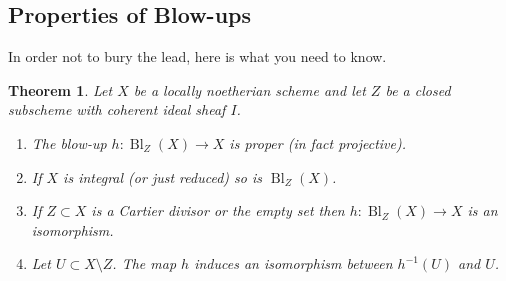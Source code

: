 \documentclass[12pt]{article}
\numberwithin{equation}{section}
\newtheorem{theorem}{Theorem}[subsection]
\theoremstyle{definition}
\newtheorem{example}[theorem]{Example}
\theoremstyle{remark}
\newcommand{\CC}{\mathbb{C}}
\newcommand{\Ocal}{\mathcal{O}}
\newcommand{\PP}{\mathbb{P}}
\renewcommand{\AA}{\mathbb{A}}
\newcommand{\Proj}{\operatorname{Proj}}
\newcommand{\Bl}{\operatorname{Bl}}
\newcommand{\taylor}[1]{{\color{blue} \sf $\spadesuit\spadesuit\spadesuit$ Taylor: [#1]}}
\begin{document}

 

\subsection{Properties of Blow-ups}

In order not to bury the lead, here is what you need to know. 
\begin{theorem}
	Let $X$ be a locally noetherian scheme and let $Z$ be a closed subscheme with coherent ideal sheaf $I$. 
	\begin{enumerate}
		\item The blow-up $h:\Bl_Z(X) \to X$ is proper (in fact projective). 
		\item If $X$ is integral (or just reduced) so is $\Bl_Z(X)$. 
		\item If $Z\subset X$ is a Cartier divisor or the empty set then $h:\Bl_Z(X)\to X$ is an isomorphism.
		\item Let $U \subset X\setminus Z$. The map $h$ induces an isomorphism between $h^{-1}(U)$ and $U$. 
	\end{enumerate}
\end{theorem}
\end{document}

